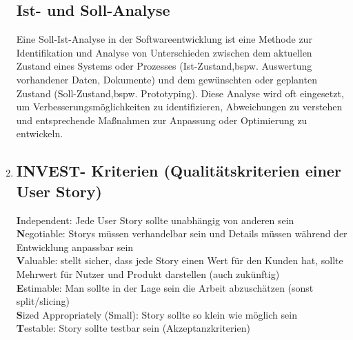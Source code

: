\documentclass{article}
\begin{document}
\begin{enumerate}[label=\alph*)]
\subsection*{Ist- und Soll-Analyse}
Eine Soll-Ist-Analyse in der Softwareentwicklung ist eine Methode zur Identifikation und Analyse von Unterschieden zwischen dem aktuellen Zustand eines Systems oder Prozesses (Ist-Zustand,bspw. Auswertung vorhandener Daten, Dokumente) und dem gewünschten oder geplanten Zustand (Soll-Zustand,bspw. Prototyping). Diese Analyse wird oft eingesetzt, um Verbesserungsmöglichkeiten zu identifizieren, Abweichungen zu verstehen und entsprechende Maßnahmen zur Anpassung oder Optimierung zu entwickeln.
\newpage

   \item \subsection*{INVEST- Kriterien (Qualitätskriterien einer User Story)} 
   \textbf{I}ndependent: Jede User Story sollte unabhängig von anderen sein\\
   \textbf{N}egotiable: Storys müssen verhandelbar sein und Details müssen während der Entwicklung anpassbar sein\\
   \textbf{V}aluable: stellt sicher, dass jede Story einen Wert für den Kunden hat, sollte Mehrwert für Nutzer und Produkt darstellen (auch zukünftig)\\
   \textbf{E}stimable: Man sollte in der Lage sein die Arbeit abzuschätzen (sonst split/slicing)\\
   \textbf{S}ized Appropriately (Small): Story sollte so klein wie möglich sein\\
   \textbf{T}estable: Story sollte testbar sein (Akzeptanzkriterien)\\
   

\end{enumerate}
\end{document}
